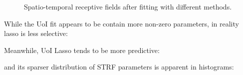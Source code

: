 \documentclass[11pt]{article}
\begin{document}
\begin{figure}[H]
	\centering
	\caption{Spatio-temporal receptive fields after fitting with different methods.}
\end{figure}

While the UoI fit appears to be contain more non-zero parameters, in reality lasso is less selective:

\begin{figure}[H]
	\centering
\end{figure}

Meanwhile, UoI Lasso tends to be more predictive:

\begin{figure}[H]
	\centering
\end{figure}

and its sparser distribution of STRF parameters is apparent in histograms:

\begin{figure}[H]
	\centering
\end{figure}
\end{document}
